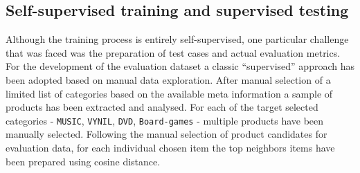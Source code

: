 \documentclass[11pt]{article}
\begin{document}
    \hypertarget{self-supervised-training-and-supervised-testing}{%
\subsection{Self-supervised training and supervised
testing}\label{self-supervised-training-and-supervised-testing}}

Although the training process is entirely self-supervised, one
particular challenge that was faced was the preparation of test cases
and actual evaluation metrics. For the development of the evaluation
dataset a classic ``supervised'' approach has been adopted based on
manual data exploration. After manual selection of a limited list of
categories based on the available meta information a sample of products
has been extracted and analysed. For each of the target selected
categories - \texttt{MUSIC}, \texttt{VYNIL}, \texttt{DVD},
\texttt{Board-games} - multiple products have been manually selected.
Following the manual selection of product candidates for evaluation
data, for each individual chosen item the top neighbors items have been
prepared using cosine distance.
\end{document}
